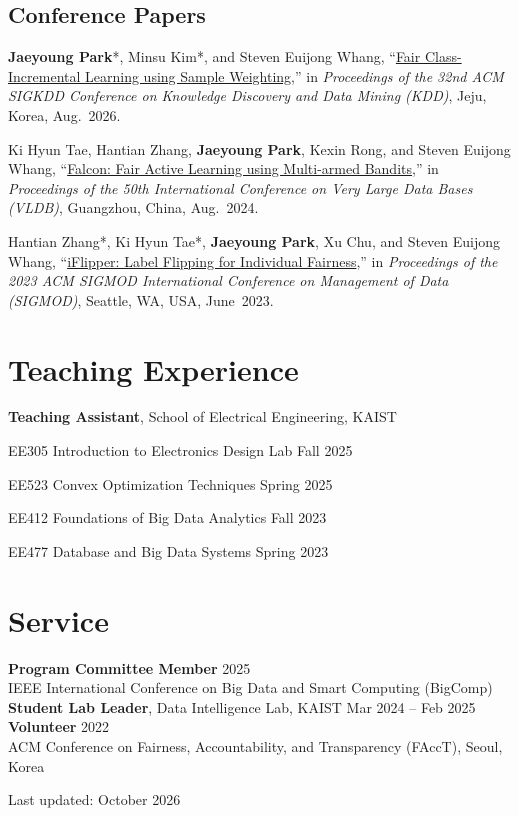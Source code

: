 \documentclass[11pt]{article}
\begin{document}
\subsection{Conference Papers}
\begin{pubs}
\item[{[C3]}] \textbf{Jaeyoung Park}*, Minsu Kim*, and Steven Euijong Whang, ``\href{https://doi.org/10.1145/3770854.3780167}{Fair Class-Incremental Learning using Sample Weighting},'' in \textit{Proceedings of the 32nd ACM SIGKDD Conference on Knowledge Discovery and Data Mining (KDD)}, Jeju, Korea, Aug.~2026.
\item[{[C2]}] Ki Hyun Tae, Hantian Zhang, \textbf{Jaeyoung Park}, Kexin Rong, and Steven Euijong Whang, ``\href{https://doi.org/10.14778/3641204.3641207}{Falcon: Fair Active Learning using Multi-armed Bandits},'' in \textit{Proceedings of the 50th International Conference on Very Large Data Bases (VLDB)}, Guangzhou, China, Aug.~2024.
\item[{[C1]}] Hantian Zhang*, Ki Hyun Tae*, \textbf{Jaeyoung Park}, Xu Chu, and Steven Euijong Whang, ``\href{https://doi.org/10.1145/3588688}{iFlipper: Label Flipping for Individual Fairness},'' in \textit{Proceedings of the 2023 ACM SIGMOD International Conference on Management of Data (SIGMOD)}, Seattle, WA, USA, June~2023.
\end{pubs}

\section{Teaching Experience}
\textbf{Teaching Assistant}, School of Electrical Engineering, KAIST
\begin{sublist}
\item EE305 Introduction to Electronics Design Lab \hfill Fall 2025
\item EE523 Convex Optimization Techniques \hfill Spring 2025
\item EE412 Foundations of Big Data Analytics \hfill Fall 2023
\item EE477 Database and Big Data Systems \hfill Spring 2023
\end{sublist}

\section{Service}
\textbf{Program Committee Member} \hfill 2025\\
IEEE International Conference on Big Data and Smart Computing (BigComp)\\[0.8ex]
\textbf{Student Lab Leader}, Data Intelligence Lab, KAIST \hfill Mar 2024 -- Feb 2025\\[0.8ex]
\textbf{Volunteer} \hfill 2022\\
ACM Conference on Fairness, Accountability, and Transparency (FAccT), Seoul, Korea

\vfill
{\footnotesize\hfill Last updated: October 2026\par}
\end{document}
